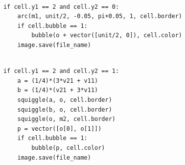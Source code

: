\documentclass{book}
\newcounter{pcounter}
\begin{document}
\begin{center}
\begin{tcolorbox}[width=5in,colback={white},title={\begin{center}\texttt{Python \thepcounter} \addtocounter{pcounter}{1}  \end{center}},colbacktitle=Red,coltitle=black]
\begin{verbatim}

            if cell.y1 == 2 and cell.y2 == 0:
                arc(m1, unit/2, -0.05, pi+0.05, 1, cell.border)
                if cell.bubble == 1:
                    bubble(o + vector([unit/2, 0]), cell.color)
                image.save(file_name)

\end{verbatim}%
\end{tcolorbox}
\end{center}

\begin{center}
\begin{tcolorbox}[width=5in,colback={white},title={\begin{center}\texttt{Python \thepcounter} \addtocounter{pcounter}{1}  \end{center}},colbacktitle=Red,coltitle=black]
\begin{verbatim}

            if cell.y1 == 2 and cell.y2 == 1:
                a = (1/4)*(3*v21 + v11)
                b = (1/4)*(v21 + 3*v11)
                squiggle(a, o, cell.border)
                squiggle(b, o, cell.border)
                squiggle(o, m2, cell.border)
                p = vector([o[0], o[1]])
                if cell.bubble == 1:
                    bubble(p, cell.color)
                image.save(file_name)

\end{verbatim}%
\end{tcolorbox}
\end{center}
\end{document}

